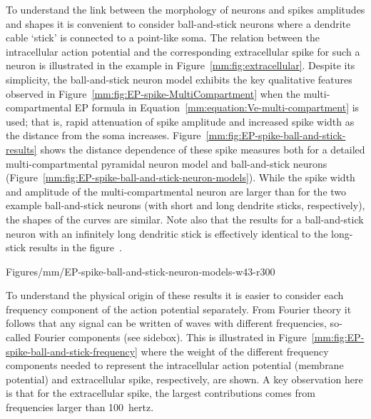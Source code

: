  
To understand the link between the morphology of neurons and spikes amplitudes and shapes
it is convenient to consider ball-and-stick neurons where a dendrite cable `stick' is connected to a point-like soma.
The relation between the intracellular action potential and the corresponding extracellular spike for such a 
neuron is illustrated in the example in Figure~\ref{mm:fig:extracellular}.
Despite its simplicity, the ball-and-stick neuron model exhibits the key qualitative features observed in
Figure~\ref{mm:fig:EP-spike-MultiCompartment} 
when the multi-compartmental EP formula in  Equation~\ref{mm:equation:Ve-multi-compartment}
is used; that is, rapid attenuation of spike amplitude 
and increased spike width as the distance from the soma increases.
Figure~\ref{mm:fig:EP-spike-ball-and-stick-results}
shows the distance dependence of these spike measures both for a detailed multi-compartmental pyramidal neuron model 
and ball-and-stick neurons (Figure~\ref{mm:fig:EP-spike-ball-and-stick-neuron-models}).
While the spike width and amplitude of the multi-compartmental neuron are larger than for
the two example ball-and-stick neurons (with short and long dendrite sticks, respectively), 
the shapes of the curves are similar. Note also that the results for a ball-and-stick neuron with an infinitely long dendritic stick is
effectively identical to the long-stick results in the figure~\citep{Pettersen2008}.


\begin{cnfigure}{Figures/mm/EP-spike-ball-and-stick-neuron-models-w43-r300}
\caption[]{Neuron models considered in results in Figure~\ref{mm:fig:EP-spike-ball-and-stick-results}. 
}
\label{mm:fig:EP-spike-ball-and-stick-neuron-models}
\figpermOurs
\end{cnfigure}


To understand the physical origin of these results it is easier to consider each frequency 
component of the action potential separately. From Fourier theory it follows that any signal
can be written of waves with different frequencies, so-called Fourier components (see sidebox).  
This is illustrated in Figure~\ref{mm:fig:EP-spike-ball-and-stick-frequency} where the weight of the different frequency components needed to
represent the intracellular action potential (membrane potential) and extracellular spike, respectively, are shown.
A key observation here is that for the extracellular spike, the largest
contributions comes from frequencies larger than 100~hertz.


